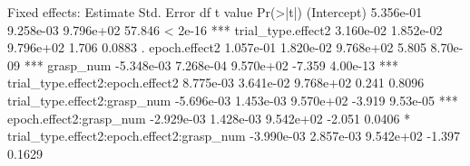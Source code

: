 
























Fixed effects:
                                             Estimate Std. Error         df     t value     Pr(>|t|)    
(Intercept)                                 5.356e-01  9.258e-03  9.796e+02      57.846     < 2e-16 ***
trial_type.effect2                          3.160e-02  1.852e-02  9.796e+02      1.706      0.0883 .  
epoch.effect2                               1.057e-01  1.820e-02  9.768e+02      5.805      8.70e-09 ***
grasp_num                                  -5.348e-03  7.268e-04  9.570e+02     -7.359      4.00e-13 ***
trial_type.effect2:epoch.effect2            8.775e-03  3.641e-02  9.768e+02      0.241      0.8096    
trial_type.effect2:grasp_num               -5.696e-03  1.453e-03  9.570e+02     -3.919      9.53e-05 ***
epoch.effect2:grasp_num                    -2.929e-03  1.428e-03  9.542e+02     -2.051      0.0406 *  
trial_type.effect2:epoch.effect2:grasp_num -3.990e-03  2.857e-03  9.542e+02     -1.397      0.1629    




